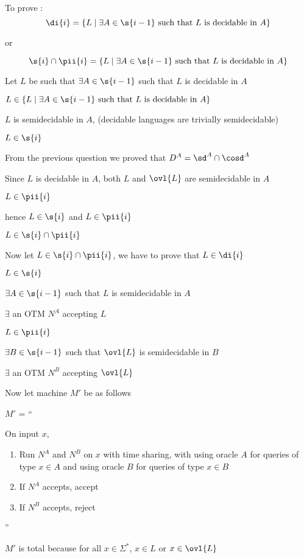 
To prove :
\[
    \di{i} = \{
        L \mid \exists A \in \s{i - 1} \text{ such that $L$ is decidable in $A$}
    \}
\]

or

\[
    \s{i} \cap \pii{i} = \{
        L \mid \exists A \in \s{i - 1} \text{ such that $L$ is decidable in $A$}
    \}
\]

Let $L$ be such that $\exists A \in \s{i - 1}$ such that $L$ is decidable in $A$

\imp
$
L \in \{
    L \mid \exists A \in \s{i - 1} \text{ such that $L$ is decidable in $A$}
\}
$

\imp
$L$ is semidecidable in $A$, (decidable languages are trivially semidecidable)

\imp
$L \in \s{i}$

From the previous question we proved that $D^A = \sd^A \cap \cosd^A$

\imp
Since $L$ is decidable in $A$, both $L$ and $\ovl{L}$ are semidecidable in $A$

\imp
$L \in \pii{i}$

hence $L \in \s{i}$ and $L \in \pii{i}$

\imp
$L \in \s{i} \cap \pii{i}$


Now let $L \in \s{i} \cap \pii{i}$, we have to prove that $L \in \di{i}$


$L \in \s{i}$

\imp
$\exists A \in \s{i - 1}$ such that $L$ is semidecidable in $A$

\imp
$\exists$ an OTM $N^A$ accepting $L$

$L \in \pii{i}$

\imp
$\exists B \in \s{i - 1}$ such that $\ovl{L}$ is semidecidable in $B$

\imp
$\exists$ an OTM $N^B$ accepting $\ovl{L}$

Now let machine $M'$ be as follows

$M'$ =
``

On input $x$,
\begin{enumerate}
    \item Run $N^A$ and $N^B$ on $x$ with time sharing, with using oracle $A$ for queries of type $x \in A$ and using oracle $B$ for queries of type $x \in B$
    \item If $N^A$ accepts, accept
    \item If $N^B$ accepts, reject
\end{enumerate}

''

$M'$ is total because for all $x \in \Sigma^*$, $x \in L$ or $x \in \ovl{L}$

